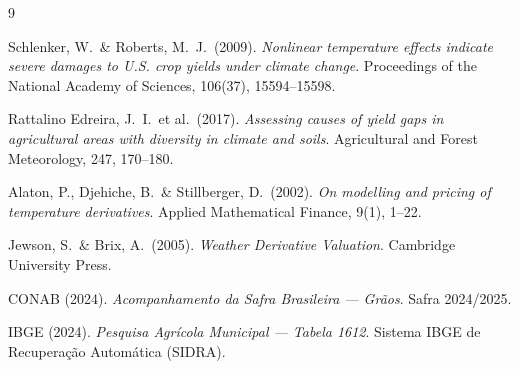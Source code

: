 \documentclass[11pt,a4paper]{article}
\begin{document}
\clearpage
\begin{thebibliography}{9}

Schlenker, W.\ \& Roberts, M.\ J.\ (2009).
\textit{Nonlinear temperature effects indicate severe damages to U.S. crop
yields under climate change}. Proceedings of the National Academy of Sciences,
106(37), 15594--15598.

Rattalino Edreira, J.\ I.\ et al.\ (2017).
\textit{Assessing causes of yield gaps in agricultural areas with diversity in
climate and soils}. Agricultural and Forest Meteorology, 247, 170--180.

Alaton, P., Djehiche, B.\ \& Stillberger, D.\ (2002).
\textit{On modelling and pricing of temperature derivatives}. Applied
Mathematical Finance, 9(1), 1--22.

Jewson, S.\ \& Brix, A.\ (2005).
\textit{Weather Derivative Valuation}. Cambridge University Press.

CONAB (2024).
\textit{Acompanhamento da Safra Brasileira --- Grãos}. Safra 2024/2025.

IBGE (2024).
\textit{Pesquisa Agrícola Municipal --- Tabela 1612}. Sistema IBGE de
Recuperação Automática (SIDRA).

\end{thebibliography}
\end{document}
